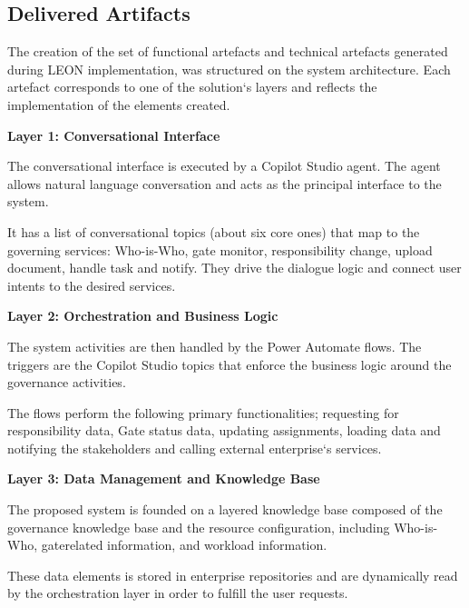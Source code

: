 \subsection{\textcolor[HTML]{003D99}{Delivered Artifacts}}

The creation of the set of functional artefacts and technical artefacts generated during LEON implementation, was structured on the system architecture. Each artefact corresponds to one of the solution‘s layers and reflects the implementation of the elements created.

\textcolor[HTML]{0066CC}{\textbf{Layer 1: Conversational Interface}}

The conversational interface is executed by a Copilot Studio agent. The agent allows natural language conversation and acts as the principal interface to the system.

It has a list of conversational topics (about six core ones) that map to the governing services:  Who-is-Who, gate monitor, responsibility change, upload document,  handle task and notify.  They drive the dialogue logic and connect user intents to the desired services.

\vspace{0.4cm}

\textcolor[HTML]{0066CC}{\textbf{Layer 2: Orchestration and Business Logic}}

The system activities are then handled by the Power Automate flows. The triggers are the Copilot Studio topics that enforce the business logic around the governance activities.

The flows perform the following primary functionalities; requesting for responsibility data, Gate status data, updating assignments, loading data and notifying the stakeholders and calling external enterprise‘s services.

\vspace{0.4cm}

\textcolor[HTML]{0066CC}{\textbf{Layer 3: Data Management and Knowledge Base}}

The proposed system is founded on a layered knowledge base composed of the governance knowledge base and the resource configuration, including Who-is-Who, gaterelated information, and workload information.

These data elements is stored in enterprise repositories and are dynamically read by the orchestration layer in order to fulfill the user requests.

\vspace{0.4cm}

